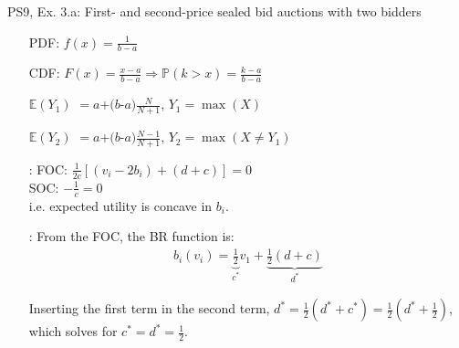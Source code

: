 \begin{frame}{PS9, Ex. 3.a: First- and second-price sealed bid auctions with two bidders}
\begin{multicols}{2}
      \begin{enumerate}
        \item[PDF:] $f(x)=\frac{1}{b-a}$
        \item[CDF:] $F(x)=\frac{x-a}{b-a}\Rightarrow\mathbb{P}(k>x)=\frac{k-a}{b-a}$
        \item[$\mathbb{E}(Y_1)$] $=a$+$(b$-$a)\frac{N}{N+1}$, $Y_1=\max(X)$
        \item[$\mathbb{E}(Y_2)$] $=a$+$(b$-$a)\frac{N-1}{N+1}$, $Y_2=\max(X\neq Y_1)$
        \item[\nth{2}:] FOC: $\frac{1}{2c}[(v_i-2b_i)+(d+c)]=0$\\
                        SOC: $-\frac{1}{c}=0$\\
                        i.e. expected utility is concave in $b_i$.
        \item[\nth{3}:] From the FOC, the BR function is:\vspace{-6pt}
                        \begin{align*}
                          b_i(v_i)=\underbrace{\frac{1}{2}}_{c^*}v_1+\underbrace{\frac{1}{2}(d+c)}_{d^*}
                        \end{align*}
        \item[]         \vspace{-6pt} Inserting the first term in the second term, $d^*=\frac{1}{2}(d^*+c^*)=\frac{1}{2}(d^*+\frac{1}{2})$, which solves for $c^*=d^*=\frac{1}{2}$.
      \end{enumerate}
      \vfill\null
    \end{multicols}
\end{frame}


